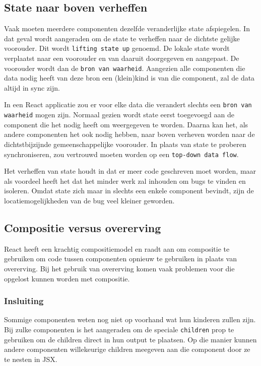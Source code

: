 \subsection{State naar boven verheffen}

Vaak moeten meerdere componenten dezelfde veranderlijke state afspiegelen. In dat geval wordt aangeraden om de state te verheffen naar de dichtste gelijke voorouder. Dit wordt \texttt{lifting state up} genoemd. De lokale state wordt verplaatst naar een voorouder en van daaruit doorgegeven en aangepast. De voorouder wordt dan de \texttt{bron van waarheid}. Aangezien alle componenten die data nodig heeft van deze bron een (klein)kind is van die component, zal de data altijd in sync zijn.  \autocite{React2019j}

In een React applicatie zou er voor elke data die verandert slechts een \texttt{bron van waarheid} mogen zijn. Normaal gezien wordt state eerst toegevoegd aan de component die het nodig heeft om weergegeven te worden. Daarna kan het, als andere componenten het ook nodig hebben, naar boven verheven worden naar de dichtstbijzijnde gemeenschappelijke voorouder. In plaats van state te proberen synchroniseren, zou vertrouwd moeten worden op een \texttt{top-down data flow}. \autocite{React2019j}

Het verheffen van state houdt in dat er meer code geschreven moet worden, maar als voordeel heeft het dat het minder werk zal inhouden om bugs te vinden en isoleren. Omdat state zich maar in slechts een enkele component bevindt, zijn de locatiemogelijkheden van de bug veel kleiner geworden.  \autocite{React2019j}

\subsection{Compositie versus overerving}

React heeft een krachtig compositiemodel en raadt aan om compositie te gebruiken om code tussen componenten opnieuw te gebruiken in plaats van overerving. Bij het gebruik van overerving komen vaak problemen voor die opgelost kunnen worden met compositie. \autocite{React2019k}

\subsubsection{Insluiting}

Sommige componenten weten nog niet op voorhand wat hun kinderen zullen zijn. Bij zulke componenten is het aangeraden om de speciale \texttt{children} prop te gebruiken om de children direct in hun output te plaatsen. Op die manier kunnen andere componenten willekeurige children meegeven aan die component door ze te nesten in JSX. \autocite{React2019k}

